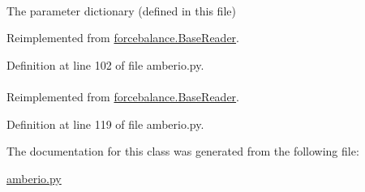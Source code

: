 \hypertarget{classforcebalance_1_1amberio_1_1FrcMod__Reader_a3cfbe5052b0dd6fa5ea840f9af7028db}{
\paragraph[{pdict}]{}}\label{classforcebalance_1_1amberio_1_1FrcMod__Reader_a3cfbe5052b0dd6fa5ea840f9af7028db}


\-The parameter dictionary (defined in this file) 



\-Reimplemented from \hyperlink{classforcebalance_1_1BaseReader_aaf18c900d6055ed4b5124f6bb26164c1}{forcebalance.\-Base\-Reader}.



\-Definition at line 102 of file amberio.\-py.

\hypertarget{classforcebalance_1_1amberio_1_1FrcMod__Reader_ad25c7e07aadb587268f3beb7a379766c}{
\paragraph[{suffix}]{}}\label{classforcebalance_1_1amberio_1_1FrcMod__Reader_ad25c7e07aadb587268f3beb7a379766c}


\-Reimplemented from \hyperlink{classforcebalance_1_1BaseReader_a48ef0584a1b6b4b6f8eb741ad8465db8}{forcebalance.\-Base\-Reader}.



\-Definition at line 119 of file amberio.\-py.



\-The documentation for this class was generated from the following file\-:\begin{DoxyCompactItemize}
\item 
\hyperlink{amberio_8py}{amberio.\-py}\end{DoxyCompactItemize}
